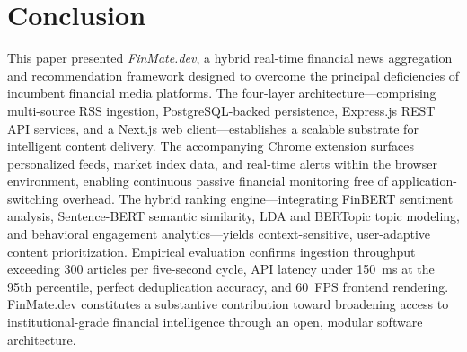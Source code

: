 \documentclass[conference]{IEEEtran}
\begin{document}
\section{Conclusion}

This paper presented \textit{FinMate.dev}, a hybrid real-time financial news aggregation and recommendation framework designed to overcome the principal deficiencies of incumbent financial media platforms. The four-layer architecture—comprising multi-source RSS ingestion, PostgreSQL-backed persistence, Express.js REST API services, and a Next.js web client—establishes a scalable substrate for intelligent content delivery. The accompanying Chrome extension surfaces personalized feeds, market index data, and real-time alerts within the browser environment, enabling continuous passive financial monitoring free of application-switching overhead. The hybrid ranking engine—integrating FinBERT sentiment analysis, Sentence-BERT semantic similarity, LDA and BERTopic topic modeling, and behavioral engagement analytics—yields context-sensitive, user-adaptive content prioritization. Empirical evaluation confirms ingestion throughput exceeding 300 articles per five-second cycle, API latency under 150~ms at the 95th percentile, perfect deduplication accuracy, and 60~FPS frontend rendering. FinMate.dev constitutes a substantive contribution toward broadening access to institutional-grade financial intelligence through an open, modular software architecture.


\end{document}
